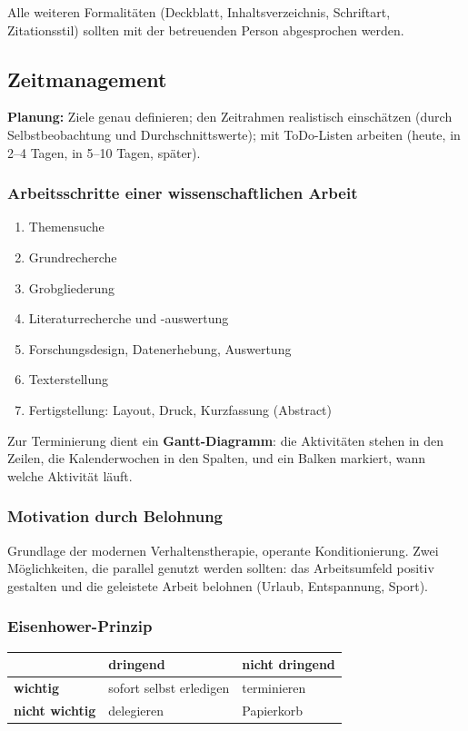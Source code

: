 \documentclass[12pt, a4paper]{article}
\begin{document}
Alle weiteren Formalitäten (Deckblatt, Inhaltsverzeichnis, Schriftart,
Zitationsstil) sollten mit der betreuenden Person abgesprochen werden.

\subsection{Zeitmanagement}

\textbf{Planung:} Ziele genau definieren; den Zeitrahmen realistisch
einschätzen (durch Selbstbeobachtung und Durchschnittswerte); mit ToDo-Listen
arbeiten (heute, in 2--4 Tagen, in 5--10 Tagen, später).

\subsubsection{Arbeitsschritte einer wissenschaftlichen Arbeit}

\begin{enumerate}
  \item Themensuche
  \item Grundrecherche
  \item Grobgliederung
  \item Literaturrecherche und -auswertung
  \item Forschungsdesign, Datenerhebung, Auswertung
  \item Texterstellung
  \item Fertigstellung: Layout, Druck, Kurzfassung (Abstract)
\end{enumerate}

Zur Terminierung dient ein \textbf{Gantt-Diagramm}: die Aktivitäten stehen in
den Zeilen, die Kalenderwochen in den Spalten, und ein Balken markiert, wann
welche Aktivität läuft.

\subsubsection{Motivation durch Belohnung}

Grundlage der modernen Verhaltenstherapie, operante Konditionierung. Zwei
Möglichkeiten, die parallel genutzt werden sollten: das Arbeitsumfeld positiv
gestalten und die geleistete Arbeit belohnen (Urlaub, Entspannung, Sport).

\subsubsection{Eisenhower-Prinzip}

\begin{center}
\begin{tabular}{lll}
 & \textbf{dringend} & \textbf{nicht dringend}\\\hline
\textbf{wichtig} & sofort selbst erledigen & terminieren\\
\textbf{nicht wichtig} & delegieren & Papierkorb\\
\end{tabular}
\end{center}
\end{document}
